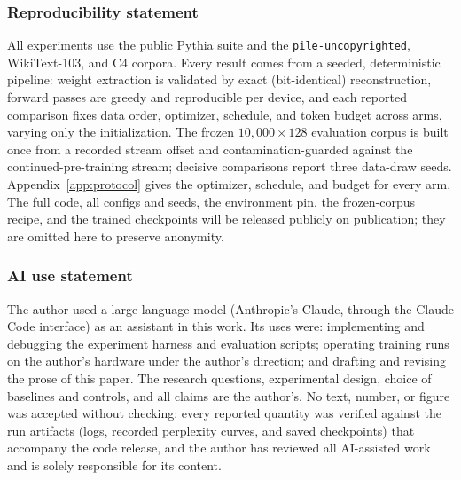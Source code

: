 \documentclass{article}
\begin{document}










\subsubsection*{Reproducibility statement}
All experiments use the public Pythia suite and the
\texttt{pile-uncopyrighted}, WikiText-103, and C4 corpora. Every result comes
from a seeded, deterministic pipeline: weight extraction is validated by exact
(bit-identical) reconstruction, forward passes are greedy and reproducible per
device, and each reported comparison fixes data order, optimizer, schedule, and
token budget across arms, varying only the initialization. The frozen
$10{,}000\times128$ evaluation corpus is built once from a recorded stream offset
and contamination-guarded against the continued-pre-training stream; decisive
comparisons report three data-draw seeds. Appendix~\ref{app:protocol} gives the
optimizer, schedule, and budget for every arm. The full code, all configs and
seeds, the environment pin, the frozen-corpus recipe, and the trained
checkpoints will be released publicly on publication; they are omitted here to
preserve anonymity.

\subsubsection*{AI use statement}
The author used a large language model (Anthropic's Claude, through the Claude
Code interface) as an assistant in this work. Its uses were: implementing and
debugging the experiment harness and evaluation scripts; operating training runs
on the author's hardware under the author's direction; and drafting and revising
the prose of this paper. The research questions, experimental design, choice of
baselines and controls, and all claims are the author's. No text, number, or
figure was accepted without checking: every reported quantity was verified
against the run artifacts (logs, recorded perplexity curves, and saved
checkpoints) that accompany the code release, and the author has reviewed all
AI-assisted work and is solely responsible for its content.




\appendix

\end{document}
